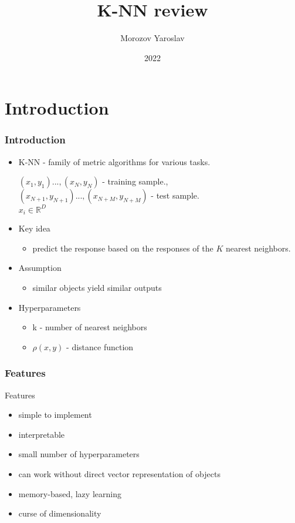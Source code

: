 \documentclass{beamer}
\title{K-NN review}
\author{Morozov Yaroslav}
\institute{MMF CMC MSU}
\date{2022}
\begin{document}
	\frame{\titlepage}
	\section{Introduction}
		\begin{frame}
			\frametitle{Introduction}
			\begin{itemize}
				 
				\item K-NN - family of metric algorithms for various tasks.
			
			$(x_1, y_1) ..., (x_N, y_N)$ - training sample., \\ 
			$(x_{N+1}, y_{N+1}) ..., (x_{N+M}, y_{N+M})$ - test sample. \\
			$x_i \in \mathbb{R}^D$
			
			\item Key idea
				\begin{itemize}
					\item 	predict the response based on the responses of the $K$ nearest neighbors.
				\end{itemize}
			\item Assumption
			\begin{itemize}
				\item similar objects yield similar outputs
			\end{itemize}
			\item Hyperparameters
			\begin{itemize}
				\item k - number of nearest neighbors
				\item $\rho(x, y)$ - distance function
			\end{itemize}
		\end{itemize}
		\end{frame}
	

		\begin{frame}
			\frametitle{Features}
			Features
			\begin{itemize}
				\item simple to implement
				\item interpretable
				\item small number of hyperparameters
				\item can work without direct vector representation of objects
				\item memory-based, lazy learning
				\item curse of dimensionality
			\end{itemize}
		\end{frame}
		
\end{document}
